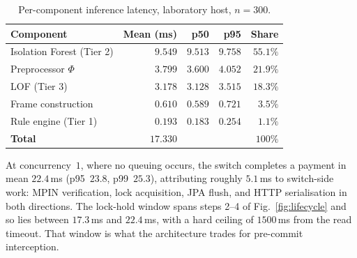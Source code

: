 \documentclass[conference]{IEEEtran}
\begin{document}
\begin{table}[t]
\centering
\caption{Per-component inference latency, laboratory host, $n=300$.}
\label{tab:components}
\renewcommand{\arraystretch}{1.12}
\footnotesize
\setlength{\tabcolsep}{5pt}
\begin{tabular}{@{}lrrrr@{}}
\toprule
\textbf{Component} & \textbf{Mean (ms)} & \textbf{p50} & \textbf{p95} & \textbf{Share} \\
\midrule
Isolation Forest (Tier 2) & $9.549$ & $9.513$ & $9.758$ & $55.1\%$ \\
Preprocessor $\Phi$       & $3.799$ & $3.600$ & $4.052$ & $21.9\%$ \\
LOF (Tier 3)              & $3.178$ & $3.128$ & $3.515$ & $18.3\%$ \\
Frame construction        & $0.610$ & $0.589$ & $0.721$ & $3.5\%$ \\
Rule engine (Tier 1)      & $0.193$ & $0.183$ & $0.254$ & $1.1\%$ \\
\midrule
\textbf{Total}            & $\mathbf{17.330}$ & & & $100\%$ \\
\bottomrule
\end{tabular}
\end{table}

At concurrency~$1$, where no queuing occurs, the switch completes a
payment in mean $22.4$\,ms (p95~$23.8$, p99~$25.3$), attributing
roughly $5.1$\,ms to switch-side work: MPIN verification, lock
acquisition, JPA flush, and HTTP serialisation in both directions. The
lock-hold window spans steps 2--4 of Fig.~\ref{fig:lifecycle} and so
lies between $17.3$\,ms and $22.4$\,ms, with a hard ceiling of
$1500$\,ms from the read timeout. That window is what the architecture
trades for pre-commit interception.
\end{document}

